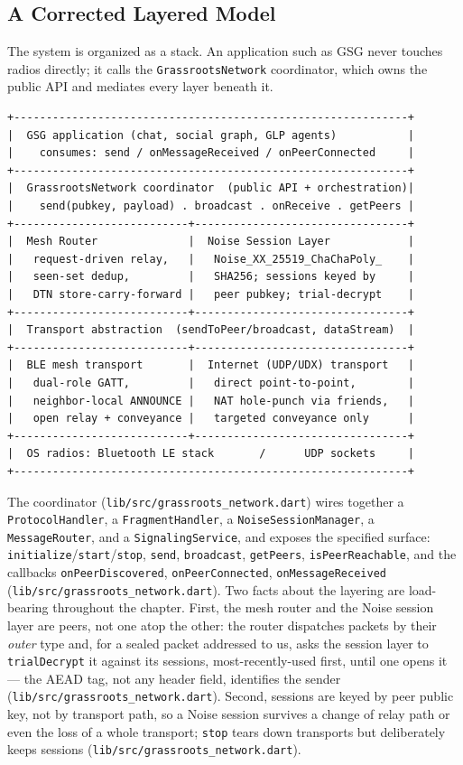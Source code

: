 \documentclass[11pt]{report}
\newcommand{\code}[1]{\texttt{\small #1}}
\begin{document}
\subsection{A Corrected Layered Model}

The system is organized as a stack. An application such as GSG never touches radios directly; it calls the \code{GrassrootsNetwork} coordinator, which owns the public API and mediates every layer beneath it.

\begin{verbatim}
+-------------------------------------------------------------+
|  GSG application (chat, social graph, GLP agents)           |
|    consumes: send / onMessageReceived / onPeerConnected     |
+-------------------------------------------------------------+
|  GrassrootsNetwork coordinator  (public API + orchestration)|
|    send(pubkey, payload) . broadcast . onReceive . getPeers |
+---------------------------+---------------------------------+
|  Mesh Router              |  Noise Session Layer            |
|   request-driven relay,   |   Noise_XX_25519_ChaChaPoly_    |
|   seen-set dedup,         |   SHA256; sessions keyed by     |
|   DTN store-carry-forward |   peer pubkey; trial-decrypt    |
+---------------------------+---------------------------------+
|  Transport abstraction  (sendToPeer/broadcast, dataStream)  |
+---------------------------+---------------------------------+
|  BLE mesh transport       |  Internet (UDP/UDX) transport   |
|   dual-role GATT,         |   direct point-to-point,        |
|   neighbor-local ANNOUNCE |   NAT hole-punch via friends,   |
|   open relay + conveyance |   targeted conveyance only      |
+---------------------------+---------------------------------+
|  OS radios: Bluetooth LE stack       /      UDP sockets     |
+-------------------------------------------------------------+
\end{verbatim}

The coordinator (\code{lib/src/grassroots_network.dart}) wires together a \code{ProtocolHandler}, a \code{FragmentHandler}, a \code{NoiseSessionManager}, a \code{MessageRouter}, and a \code{SignalingService}, and exposes the specified surface: \code{initialize}/\code{start}/\code{stop}, \code{send}, \code{broadcast}, \code{getPeers}, \code{isPeerReachable}, and the callbacks \code{onPeerDiscovered}, \code{onPeerConnected}, \code{onMessageReceived} (\code{lib/src/grassroots_network.dart}). Two facts about the layering are load-bearing throughout the chapter. First, the mesh router and the Noise session layer are peers, not one atop the other: the router dispatches packets by their \emph{outer} type and, for a sealed packet addressed to us, asks the session layer to \code{trialDecrypt} it against its sessions, most-recently-used first, until one opens it — the AEAD tag, not any header field, identifies the sender (\code{lib/src/grassroots_network.dart}). Second, sessions are keyed by peer public key, not by transport path, so a Noise session survives a change of relay path or even the loss of a whole transport; \code{stop} tears down transports but deliberately keeps sessions (\code{lib/src/grassroots_network.dart}).
\end{document}
